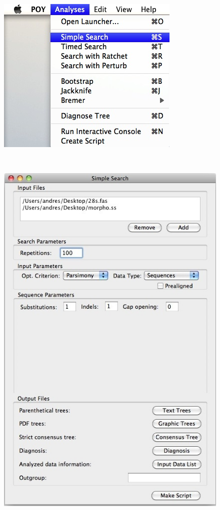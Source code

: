\begin{figure}
\centering
\begin{minipage}[c]{0.45\textwidth}
\includegraphics[width=\textwidth]{doc/figures/simplesearch_menu.jpg}
\end{minipage}
\,
\begin{minipage}[c]{0.52\textwidth}
\includegraphics[width=\textwidth]{doc/figures/simplesearch_window_filled.jpg}

\end{minipage}
\end{figure}
